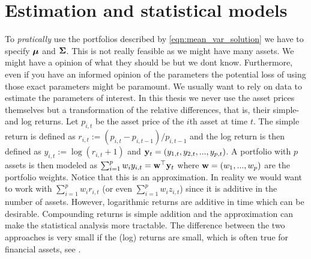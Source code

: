 \documentclass[oneside]{book}\usepackage{knitr}
\begin{document}
\chapter[Estimation \& models]{Estimation and statistical models}\label{ch:estim}


To \textit{pratically} use the portfolios described by \eqref{eqn:mean_var_solution} we have to specify $\mbox{\boldmath$\mu$}$ and $\mathbf{\Sigma}$. 
This is not really feasible as we might have many assets. 
We might have a opinion of what they should be but we dont know. 
Furthermore, even if you have an informed opinion of the parameters the potential loss of using those exact parameters might be paramount. 
We usually want to rely on data to estimate the parameters of interest. 
In this thesis we never use the asset prices themselves but a transformation of the relative differences, that is, their simple- and log returns. 
Let $p_{i,t}$ be the asset price of the $i$th asset at time $t$. 
The simple return is defined as $r_{i,t} := (p_{i,t}-p_{i,t-1})/p_{i,t-1}$ and the log return is then defined as $y_{i,t} := \log(r_{i,t} + 1)$ and $\mathbf{y}_t=(y_{1,t},y_{2,t},..., y_{p,t})$.
A portfolio with $p$ assets is then modeled as $\sum_{i=1}^p w_i y_{i,t} = \mathbf{w}^\top \mathbf{y}_t$ where $\mathbf{w}=(w_1, ..., w_p)$ are the portfolio weights.
Notice that this is an approximation. 
In reality we would want to work with $\sum_{i=1}^p w_i r_{i,t}$ (or even $\sum_{i=1}^p w_i z_{i,t}$) since it is additive in the number of assets. 
However, logarithmic returns are additive in time which can be desirable. 
Compounding returns is simple addition and the approximation can make the statistical analysis more tractable. 
The difference between the two approaches is very small if the (log) returns are small, which is often true for financial assets, see \citet[p. 5]{tsay2005analysis}. 
\end{document}
